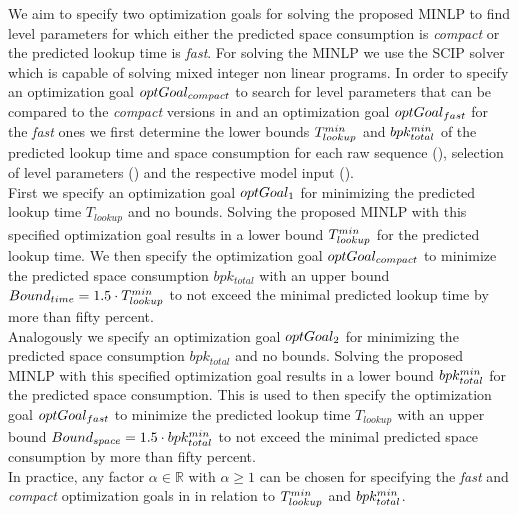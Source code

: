 \documentclass[a4paper,titlepage,onecolumn,oneside,12pt,nenglish,titlepage=firstiscover]{scrbook}
\theoremstyle{plain} %
\theoremstyle{definition} %
\theoremstyle{remark} %
\theoremstyle{plain}
\newcommand{\RR}{\mathbb{R}} %
\newcommand{\timeForOperationOnStructure}[2]{T_{#1_{#2}}} %
\begin{document}
We aim to specify two optimization goals for solving the proposed MINLP to find level parameters for which either the predicted space consumption is \textit{compact} or the predicted lookup time is \textit{fast}. For solving the MINLP we use the SCIP solver \cite{AchterbergBertholdKochetal.2008, Achterberg2009, BestuzhevaChmielaMuellerSerranoVigerskeWegscheider2023} which is capable of solving mixed integer non linear programs. In order to specify an optimization goal $optGoal_{compact}$ to search for level parameters that can be compared to the \textit{compact} versions in  and an optimization goal $optGoal_{fast}$ for the \textit{fast} ones we first determine the lower bounds $\minLookupTime$ and $bpk_{total}^{min}$ of the predicted lookup time and space consumption for each raw sequence (), selection of level parameters () and the respective model input ().\\
First we specify an optimization goal $optGoal_{1}$ for minimizing the predicted lookup time $\timeForOperationOnStructure{lookup}{}$ and no bounds. Solving the proposed MINLP with this specified optimization goal results in a lower bound $\minLookupTime$ for the predicted lookup time. We then specify the optimization goal $optGoal_{compact}$ to minimize the predicted space consumption $bpk_{total}$ with an upper bound $\boundTime = 1.5 \cdot \minLookupTime$ to not exceed the minimal predicted lookup time by more than fifty percent.\\
Analogously we specify an optimization goal $optGoal_{2}$ for minimizing the predicted space consumption $bpk_{total}$ and no bounds. Solving the proposed MINLP with this specified optimization goal results in a lower bound $bpk_{total}^{min}$ for the predicted space consumption. This is used to then specify the optimization goal $optGoal_{fast}$ to minimize the predicted lookup time $\timeForOperationOnStructure{lookup}{}$ with an upper bound $Bound_{space} = 1.5 \cdot bpk_{total}^{min}$ to not exceed the minimal predicted space consumption by more than fifty percent.\\
In practice, any factor $\alpha \in \RR$ with $\alpha \geq 1$ can be chosen for specifying the \textit{fast} and \textit{compact} optimization goals in in relation to $\minLookupTime$ and $bpk_{total}^{min}$. 
\end{document}
